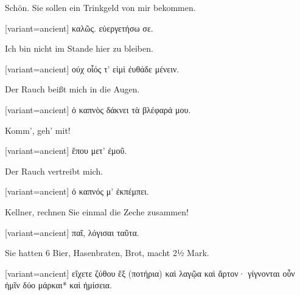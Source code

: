 Schön. Sie sollen ein Trinkgeld von mir bekommen.

\switchcolumn

\begin{greek}[variant=ancient]%
καλῶς. εὐεργετήσω σε.

\end{greek}%
\switchcolumn*

Ich bin nicht im Stande hier zu bleiben.

\switchcolumn

\begin{greek}[variant=ancient]%
οὐχ οἷός τ' εἰμὶ ἐυθάδε μένειν.

\end{greek}%
\switchcolumn*

Der Rauch beißt mich in die Augen.

\switchcolumn

\begin{greek}[variant=ancient]%
ὁ καπνὸς δάκνει τὰ βλέφαρά μου.

\end{greek}%
\switchcolumn*

Komm', geh' mit!

\switchcolumn

\begin{greek}[variant=ancient]%
ἕπου μετ' ἐμοῦ.

\end{greek}%
\switchcolumn*

Der Rauch vertreibt mich.

\switchcolumn

\begin{greek}[variant=ancient]%
ὁ καπνός μ' ἐκπέμπει.

\end{greek}%
\switchcolumn*

Kellner, rechnen Sie einmal die Zeche zusammen!

\switchcolumn

\begin{greek}[variant=ancient]%
παῖ, λόγισαι ταῦτα.

\end{greek}%
\switchcolumn*

Sie hatten 6 Bier, Hasenbraten, Brot, macht 2½ Mark.

\switchcolumn

\begin{greek}[variant=ancient]%
εἴχετε ζύθου ἕξ (ποτήρια) καὶ λαγῷα καὶ ἄρτον· γίγνονται οὖν ἡμῖν
δύο μάρκαι{*} καὶ ἡμίσεια.

\end{greek}%
\switchcolumn*

